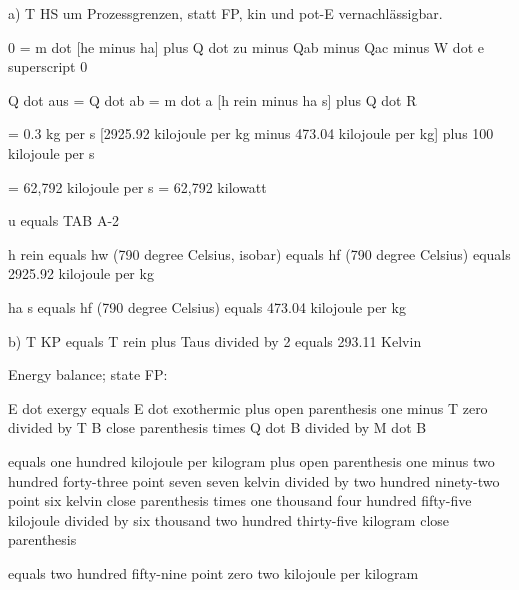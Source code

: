 a) T HS um Prozessgrenzen, statt FP, kin und pot-E vernachlässigbar.

0 = m dot [he minus ha] plus Q dot zu minus Qab minus Qac minus W dot e superscript 0

Q dot aus = Q dot ab = m dot a [h rein minus ha s] plus Q dot R

= 0.3 kg per s [2925.92 kilojoule per kg minus 473.04 kilojoule per kg] plus 100 kilojoule per s

= 62,792 kilojoule per s = 62,792 kilowatt

u equals TAB A-2

h rein equals hw (790 degree Celsius, isobar) equals hf (790 degree Celsius) equals 2925.92 kilojoule per kg

ha s equals hf (790 degree Celsius) equals 473.04 kilojoule per kg

b) T KP equals T rein plus Taus divided by 2 equals 293.11 Kelvin

Energy balance; state FP:

E dot exergy equals E dot exothermic plus open parenthesis one minus T zero divided by T B close parenthesis times Q dot B divided by M dot B

equals one hundred kilojoule per kilogram plus open parenthesis one minus two hundred forty-three point seven seven kelvin divided by two hundred ninety-two point six kelvin close parenthesis times one thousand four hundred fifty-five kilojoule divided by six thousand two hundred thirty-five kilogram close parenthesis

equals two hundred fifty-nine point zero two kilojoule per kilogram